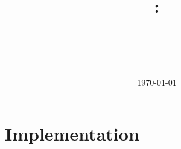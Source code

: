 \documentclass{article}
\title{
\vspace{2in}
\textmd{\textbf{\hmwkClass:\\ \hmwkTitle}}\\
\vspace{0.1in}\large{\textit{\hmwkClassInstructor\ }}
\vspace{3in}
}
\author{\textbf{\hmwkAuthorName}}
\date{\today} %
\begin{document}
\maketitle



\newpage
\tableofcontents
\newpage

\section{Implementation}

\end{document}
